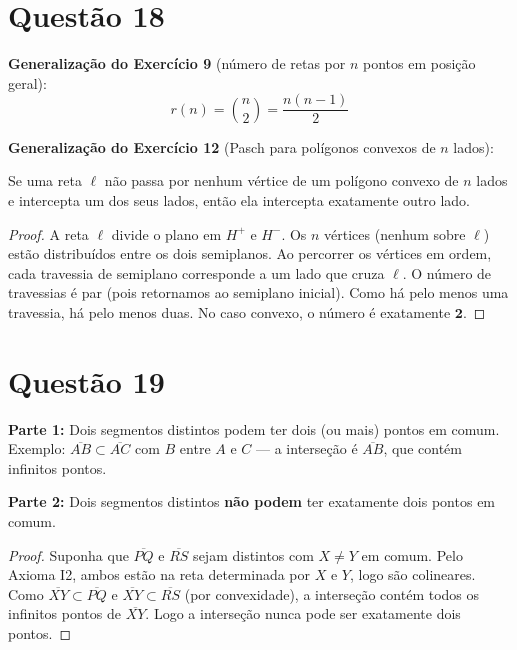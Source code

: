 \documentclass[12pt,a4paper]{article}
\begin{document}
\section*{Quest\~ao 18}

\textbf{Generaliza\c{c}\~ao do Exerc\'icio 9} (n\'umero de retas por $n$ pontos em posi\c{c}\~ao geral):
$$r(n) = \binom{n}{2} = \frac{n(n-1)}{2}$$

\textbf{Generaliza\c{c}\~ao do Exerc\'icio 12} (Pasch para pol\'igonos convexos de $n$ lados):

Se uma reta $\ell$ n\~ao passa por nenhum v\'ertice de um pol\'igono convexo de $n$ lados e intercepta um dos seus lados, ent\~ao ela intercepta exatamente outro lado.

\begin{proof}
A reta $\ell$ divide o plano em $H^+$ e $H^-$. Os $n$ v\'ertices (nenhum sobre $\ell$) est\~ao distribu\'idos entre os dois semiplanos. Ao percorrer os v\'ertices em ordem, cada travessia de semiplano corresponde a um lado que cruza $\ell$. O n\'umero de travessias \'e par (pois retornamos ao semiplano inicial). Como h\'a pelo menos uma travessia, h\'a pelo menos duas. No caso convexo, o n\'umero \'e exatamente $\mathbf{2}$.
\end{proof}

\section*{Quest\~ao 19}

\textbf{Parte 1:} Dois segmentos distintos podem ter dois (ou mais) pontos em comum. Exemplo: $\overline{AB} \subset \overline{AC}$ com $B$ entre $A$ e $C$ — a interse\c{c}\~ao \'e $\overline{AB}$, que cont\'em infinitos pontos.

\textbf{Parte 2:} Dois segmentos distintos \textbf{n\~ao podem} ter exatamente dois pontos em comum.

\begin{proof}
Suponha que $\overline{PQ}$ e $\overline{RS}$ sejam distintos com $X \neq Y$ em comum. Pelo Axioma I2, ambos est\~ao na reta determinada por $X$ e $Y$, logo s\~ao colineares. Como $\overline{XY} \subset \overline{PQ}$ e $\overline{XY} \subset \overline{RS}$ (por convexidade), a interse\c{c}\~ao cont\'em todos os infinitos pontos de $\overline{XY}$. Logo a interse\c{c}\~ao nunca pode ser exatamente dois pontos.
\end{proof}
\end{document}
